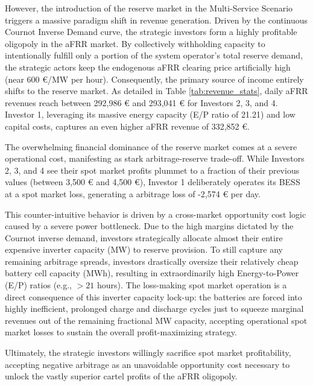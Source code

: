 However, the introduction of the reserve market in the Multi-Service Scenario triggers a massive paradigm shift in revenue generation. Driven by the continuous Cournot Inverse Demand curve, the strategic investors form a highly profitable oligopoly in the aFRR market. By collectively withholding capacity to intentionally fulfill only a portion of the system operator's total reserve demand, the strategic actors keep the endogenous aFRR clearing price artificially high (near 600 €/MW per hour). Consequently, the primary source of income entirely shifts to the reserve market. As detailed in Table \ref{tab:revenue_stats}, daily aFRR revenues reach between 292,986 € and 293,041 € for Investors 2, 3, and 4. Investor 1, leveraging its massive energy capacity (E/P ratio of 21.21) and low capital costs, captures an even higher aFRR revenue of 332,852 €.

The overwhelming financial dominance of the reserve market comes at a severe operational cost, manifesting as stark arbitrage-reserve trade-off. While Investors 2, 3, and 4 see their spot market profits plummet to a fraction of their previous values (between 3,500 € and 4,500 €), Investor 1 deliberately operates its BESS at a spot market loss, generating a arbitrage loss of -2,574 € per day.

This counter-intuitive behavior is driven by a cross-market opportunity cost logic caused by a severe power bottleneck. Due to the high margins dictated by the Cournot inverse demand, investors strategically allocate almost their entire expensive inverter capacity (MW) to reserve provision. To still capture any remaining arbitrage spreads, investors drastically oversize their relatively cheap battery cell capacity (MWh), resulting in extraordinarily high Energy-to-Power (E/P) ratios (e.g., $> 21$ hours). The loss-making spot market operation is a direct consequence of this inverter capacity lock-up: the batteries are forced into highly inefficient, prolonged charge and discharge cycles just to squeeze marginal revenues out of the remaining fractional MW capacity, accepting operational spot market losses to sustain the overall profit-maximizing strategy.

Ultimately, the strategic investors willingly sacrifice spot market profitability, accepting negative arbitrage as an unavoidable opportunity cost necessary to unlock the vastly superior cartel profits of the aFRR oligopoly.

